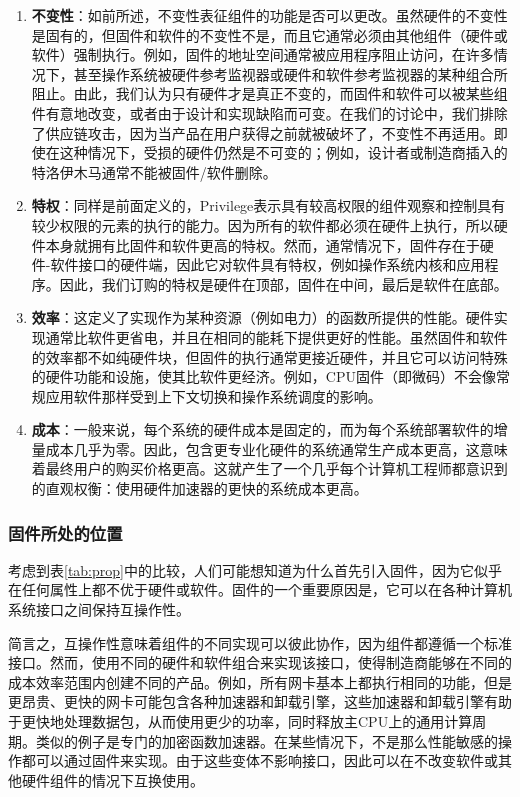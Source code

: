 \begin{enumerate}
    \item  \textbf{不变性}：如前所述，不变性表征组件的功能是否可以更改。虽然硬件的不变性是固有的，但固件和软件的不变性不是，而且它通常必须由其他组件（硬件或软件）强制执行。例如，固件的地址空间通常被应用程序阻止访问，在许多情况下，甚至操作系统被硬件参考监视器或硬件和软件参考监视器的某种组合所阻止。由此，我们认为只有硬件才是真正不变的，而固件和软件可以被某些组件有意地改变，或者由于设计和实现缺陷而可变。在我们的讨论中，我们排除了供应链攻击，因为当产品在用户获得之前就被破坏了，不变性不再适用。即使在这种情况下，受损的硬件仍然是不可变的；例如，设计者或制造商插入的特洛伊木马通常不能被固件/软件删除。

    \item  \textbf{特权}：同样是前面定义的，Privilege表示具有较高权限的组件观察和控制具有较少权限的元素的执行的能力。因为所有的软件都必须在硬件上执行，所以硬件本身就拥有比固件和软件更高的特权。然而，通常情况下，固件存在于硬件-软件接口的硬件端，因此它对软件具有特权，例如操作系统内核和应用程序。因此，我们订购的特权是硬件在顶部，固件在中间，最后是软件在底部。

    \item  \textbf{效率}：这定义了实现作为某种资源（例如电力）的函数所提供的性能。硬件实现通常比软件更省电，并且在相同的能耗下提供更好的性能。虽然固件和软件的效率都不如纯硬件块，但固件的执行通常更接近硬件，并且它可以访问特殊的硬件功能和设施，使其比软件更经济。例如，CPU固件（即微码）不会像常规应用软件那样受到上下文切换和操作系统调度的影响。

    \item \textbf{成本}：一般来说，每个系统的硬件成本是固定的，而为每个系统部署软件的增量成本几乎为零。因此，包含更专业化硬件的系统通常生产成本更高，这意味着最终用户的购买价格更高。这就产生了一个几乎每个计算机工程师都意识到的直观权衡：使用硬件加速器的更快的系统成本更高。
\end{enumerate}

\subsubsection{固件所处的位置}

考虑到表\ref{tab:prop}中的比较，人们可能想知道为什么首先引入固件，因为它似乎在任何属性上都不优于硬件或软件。固件的一个重要原因是，它可以在各种计算机系统接口之间保持互操作性。

简言之，互操作性意味着组件的不同实现可以彼此协作，因为组件都遵循一个标准接口。然而，使用不同的硬件和软件组合来实现该接口，使得制造商能够在不同的成本效率范围内创建不同的产品。例如，所有网卡基本上都执行相同的功能，但是更昂贵、更快的网卡可能包含各种加速器和卸载引擎，这些加速器和卸载引擎有助于更快地处理数据包，从而使用更少的功率，同时释放主CPU上的通用计算周期。类似的例子是专门的加密函数加速器。在某些情况下，不是那么性能敏感的操作都可以通过固件来实现。由于这些变体不影响接口，因此可以在不改变软件或其他硬件组件的情况下互换使用。

